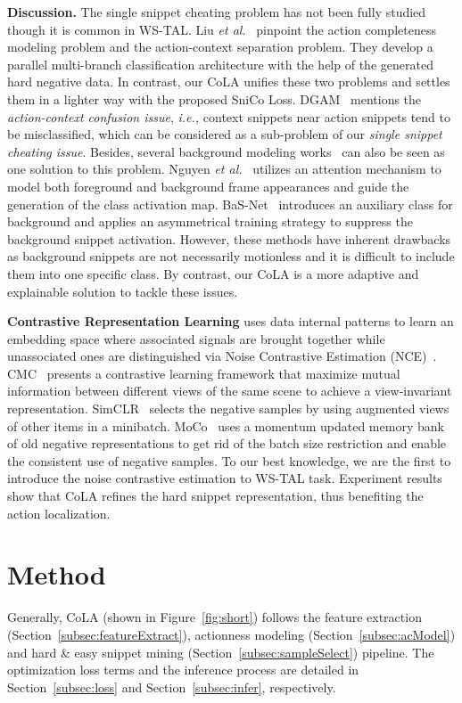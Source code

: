 \documentclass[final]{cvpr}
\begin{document}
\textbf{Discussion.} The single snippet cheating problem has not been fully studied though it is common in WS-TAL. Liu \textit{et al.}~\cite{liu2019completeness} pinpoint the action completeness modeling problem and the action-context separation problem. They develop a parallel multi-branch classification architecture with the help of the generated hard negative data. In contrast, our CoLA unifies these two problems and settles them in a lighter way with the proposed SniCo Loss. DGAM~\cite{shi2020weakly} mentions the \textit{action-context confusion issue}, \textit{i.e.,} context snippets near action snippets tend to be misclassified, which can be considered as a sub-problem of our \textit{single snippet cheating issue}. Besides, several background modeling works~\cite{nguyen2019weakly,lee2020background,shi2020weakly} can also be seen as one solution to this problem. Nguyen \textit{et al.}~\cite{nguyen2019weakly} utilizes an attention mechanism to model both foreground and background frame appearances and guide the generation of the class activation map. BaS-Net~\cite{lee2020background} introduces an auxiliary class for background and applies an asymmetrical training strategy to suppress the background snippet activation. However, these methods have inherent drawbacks as background snippets are not necessarily motionless and it is difficult to include them into one specific class. By contrast, our CoLA is a more adaptive and explainable solution to tackle these issues.

\textbf{Contrastive Representation Learning} uses data internal patterns to learn an embedding space where associated signals are brought together while unassociated ones are distinguished via Noise Contrastive Estimation (NCE)~\cite{gutmann2010noise}. CMC~\cite{tian2019contrastive} presents a contrastive learning framework that maximize mutual information between different views of the same scene to achieve a view-invariant representation. SimCLR~\cite{chen2020simple} selects the negative samples by using augmented views of other items in a minibatch. MoCo~\cite{he2020momentum} uses a momentum updated memory bank of old negative representations to get rid of the batch size restriction and enable the consistent use of negative samples. To our best knowledge, we are the first to introduce the noise contrastive estimation to WS-TAL task. Experiment results show that CoLA refines the hard snippet representation, thus benefiting the action localization.

 \section{Method}
Generally, CoLA (shown in Figure~\ref{fig:short}) follows the feature extraction (Section~\ref{subsec:featureExtract}), actionness modeling (Section~\ref{subsec:acModel}) and hard \& easy snippet mining (Section~\ref{subsec:sampleSelect}) pipeline. The optimization loss terms and the inference process are detailed in Section~\ref{subsec:loss} and Section~\ref{subsec:infer}, respectively. 
\end{document}
